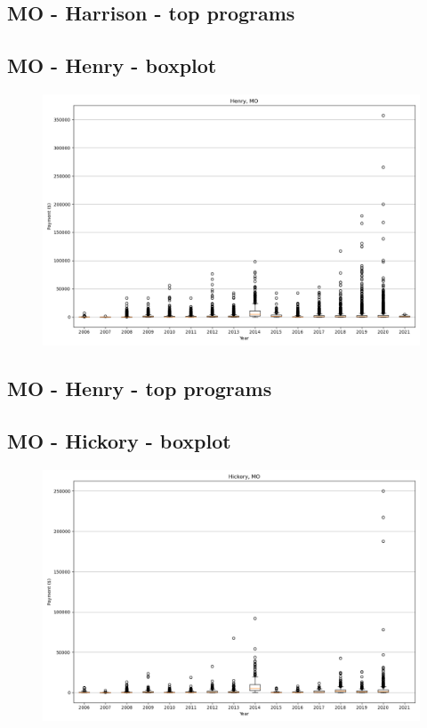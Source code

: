 \subsection*{MO - Harrison - top programs}

\newpage
\subsection*{MO - Henry - boxplot}
\begin{figure}[h]
\centering
\includegraphics[width=7in]{../output/boxplots/counties/Henry-MO_boxplot.png}
\end{figure}


\subsection*{MO - Henry - top programs}

\newpage
\subsection*{MO - Hickory - boxplot}
\begin{figure}[h]
\centering
\includegraphics[width=7in]{../output/boxplots/counties/Hickory-MO_boxplot.png}
\end{figure}


